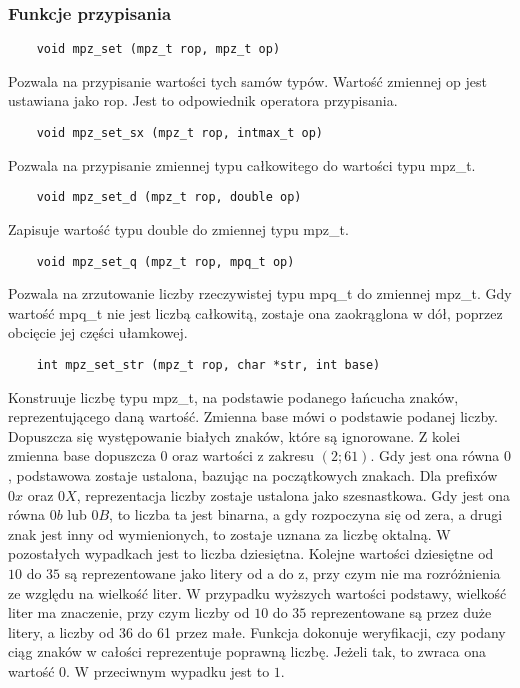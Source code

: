 \documentclass[oneside,a4paper]{book}
\begin{document}
	\subsubsection{Funkcje przypisania}
	
	\begin{lstlisting}
	void mpz_set (mpz_t rop, mpz_t op)
	\end{lstlisting}
	
	Pozwala na przypisanie wartości tych samów typów. Wartość zmiennej op jest ustawiana jako rop. Jest to odpowiednik operatora przypisania.
	
	\begin{lstlisting}
	void mpz_set_sx (mpz_t rop, intmax_t op)
	\end{lstlisting}
	
	Pozwala na przypisanie zmiennej typu całkowitego do wartości typu mpz\_t.
	
	\begin{lstlisting}
	void mpz_set_d (mpz_t rop, double op)
	\end{lstlisting}
	
	Zapisuje wartość typu double do zmiennej typu mpz\_t.
	
	\begin{lstlisting}
	void mpz_set_q (mpz_t rop, mpq_t op)
	\end{lstlisting}
	
	Pozwala na zrzutowanie liczby rzeczywistej typu mpq\_t do zmiennej mpz\_t. Gdy wartość mpq\_t nie jest liczbą całkowitą, zostaje ona zaokrąglona w dół, poprzez obcięcie jej części ułamkowej.
	
	\begin{lstlisting}
	int mpz_set_str (mpz_t rop, char *str, int base)
	\end{lstlisting}
	
	Konstruuje liczbę typu mpz\_t, na podstawie podanego łańcucha znaków, reprezentującego daną wartość. Zmienna base mówi o podstawie podanej liczby. Dopuszcza się występowanie białych znaków, które są ignorowane. Z kolei zmienna base dopuszcza $0$ oraz wartości z zakresu $(2;61)$. Gdy jest ona równa $0$, podstawowa zostaje ustalona, bazując na początkowych znakach. Dla prefixów $0x$ oraz $0X$, reprezentacja liczby zostaje ustalona jako szesnastkowa. Gdy jest ona równa $0b$ lub $0B$, to liczba ta jest binarna, a gdy rozpoczyna się od zera, a drugi znak jest inny od wymienionych, to zostaje uznana za liczbę oktalną. W pozostałych wypadkach jest to liczba dziesiętna. Kolejne wartości dziesiętne od $10$ do $35$ są reprezentowane jako litery od a do z, przy czym nie ma rozróżnienia ze względu na wielkość liter. W przypadku wyższych wartości podstawy, wielkość liter ma znaczenie, przy czym liczby od $10$ do $35$ reprezentowane są przez duże litery, a liczby od 36 do 61 przez małe. Funkcja dokonuje weryfikacji, czy podany ciąg znaków w całości reprezentuje poprawną liczbę. Jeżeli tak, to zwraca ona wartość $0$. W przeciwnym wypadku jest to $1$.
	
\end{document}
